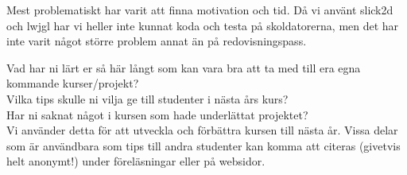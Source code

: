 Mest problematiskt har varit att finna motivation och tid. Då vi använt slick2d och lwjgl har vi heller inte kunnat koda och testa på skoldatorerna, men det har inte varit något större problem annat än på redovisningspass.

{\color{red}Vad har ni lärt er så här långt som kan vara bra att ta med till era egna kommande kurser/projekt?\\
Vilka tips skulle ni vilja ge till studenter i nästa års kurs?\\
Har ni saknat något i kursen som hade underlättat projektet?\\}
\vspace{11pt}
{\color{red}Vi använder detta för att utveckla och förbättra kursen till nästa år.  Vissa delar som är användbara som tips till andra studenter kan komma att citeras (givetvis helt anonymt!) under föreläsningar eller på websidor.\\}
